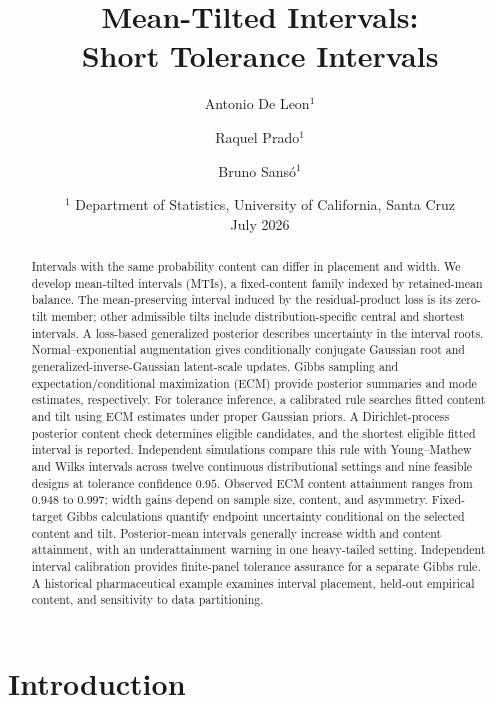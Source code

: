 \documentclass[11pt]{article}
\title{\vspace{-0.6cm}Mean-Tilted Intervals:\\
Short Tolerance Intervals}
\author{Antonio De Leon$^{1}$ \and Raquel Prado$^{1}$ \and Bruno Sans\'o$^{1}$}
\date{\small $^{1}$ Department of Statistics, University of California, Santa Cruz\\
\vspace{0.25em}July 2026}
\numberwithin{equation}{section}
\begin{document}
\maketitle
\vspace{-1.25em}

\begin{abstract}
\noindent
Intervals with the same probability content can differ in placement and width.
We develop mean-tilted intervals (MTIs), a fixed-content family indexed by
retained-mean balance. The mean-preserving interval induced by the
residual-product loss is its zero-tilt member; other admissible tilts include
distribution-specific central and shortest intervals. A loss-based generalized
posterior describes uncertainty in the interval roots. Normal--exponential
augmentation gives conditionally conjugate Gaussian root and
generalized-inverse-Gaussian latent-scale updates. Gibbs sampling and
expectation/conditional maximization (ECM) provide posterior summaries and
mode estimates, respectively.
For tolerance inference, a calibrated rule searches fitted content and tilt
using ECM estimates under proper Gaussian priors. A Dirichlet-process
posterior content check determines eligible candidates, and the shortest
eligible fitted interval is reported. Independent simulations compare this
rule with Young--Mathew and Wilks intervals across twelve continuous
distributional settings and nine feasible designs at tolerance confidence \(0.95\).
Observed ECM content attainment ranges from \(0.948\) to \(0.997\); width gains
depend on sample size, content, and asymmetry. Fixed-target Gibbs calculations
quantify endpoint uncertainty conditional on the selected content and tilt.
Posterior-mean intervals generally increase width and content
attainment, with an underattainment warning in one heavy-tailed setting.
Independent interval calibration provides finite-panel tolerance assurance
for a separate Gibbs rule.
A historical pharmaceutical example examines interval placement, held-out
empirical content, and sensitivity to data partitioning.
\end{abstract}


\section{Introduction}
\label{sec:introduction}
\end{document}
